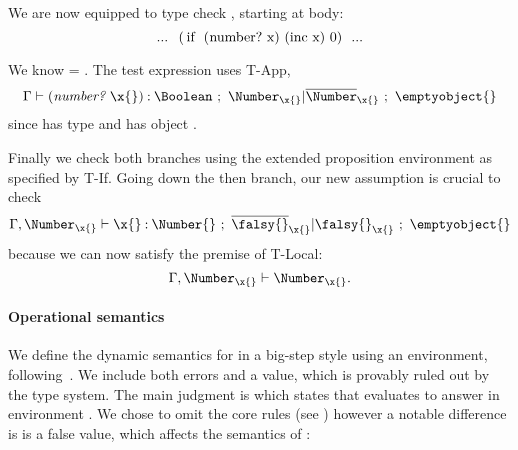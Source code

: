 {We are now equipped to type check
, starting at body:
$$
\clj{... (if (number? x) (inc x) 0) ...}
$$

We know {\propenv{}} = {\isprop{\UnionNilNum{}}{\x{}}}.
The test expression uses T-App, 
$$
\judgement{\propenv{}}{\hastype{\appexp{\numberhuh{}}{\x{}}}{\Boolean}}{\filterset{\isprop{\Number}{\x{}}}{\notprop{\Number}{\x{}}}}{\emptyobject{}}
$$
since \numberhuh{} has type
{\ArrowOne{\x{}}{\Top}{\Boolean}
        {\filterset{\isprop{\Number}{\x{}}}{\notprop{\Number}{\x{}}}}{\emptyobject{}}}
      and \x{} has object \x{}.

Finally we check both branches using the extended proposition environment as specified by T-If.
Going down the then branch, our new assumption {\isprop{\Number}{\x{}}} is crucial to check
$$
\judgement{{\propenv{}},{\isprop{\Number}{\x{}}}}{\hastype{\x{}}{\Number{}}}{\filterset{\notprop{\falsy{}}{\x{}}}{\isprop{\falsy{}}{\x{}}}}{\emptyobject{}}
$$
because we can now satisfy the premise of T-Local:
$$
\inpropenv{{\propenv{}},\isprop{\Number}{\x{}}}{\isprop{\Number}{\x{}}}.
$$


\paragraph{Operational semantics} We define the dynamic semantics for \lambdatc{}
in a big-step style using an environment, following~\citet{TF10}.
We include both errors and a \wrong{} value, which is provably ruled out by the
type system.
The main judgment is 
which states that \e{} evaluates to answer  in environment
\openv{}. We chose to omit the core rules (see )
however a notable difference is \nil{} is a false value, which affects the
semantics of \ifliteral{}:

}
